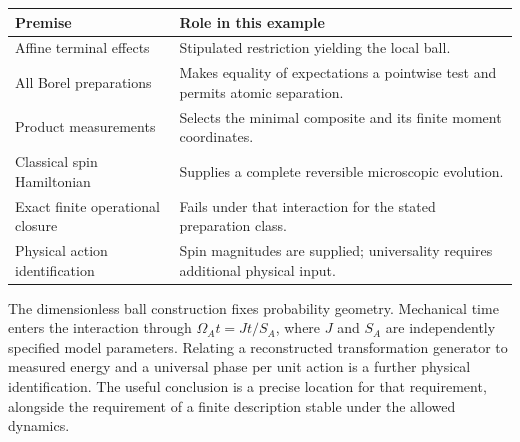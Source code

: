 \documentclass[11pt,a4paper]{article}
\begin{document}
\begin{center}\small
\begin{tabularx}{\linewidth}{@{}lX@{}}\toprule
Premise & Role in this example\\\midrule
Affine terminal effects & Stipulated restriction yielding the local ball.\\
All Borel preparations & Makes equality of expectations a pointwise test and permits atomic separation.\\
Product measurements & Selects the minimal composite and its finite moment coordinates.\\
Classical spin Hamiltonian & Supplies a complete reversible microscopic evolution.\\
Exact finite operational closure & Fails under that interaction for the stated preparation class.\\
Physical action identification & Spin magnitudes are supplied; universality requires additional physical input.\\\bottomrule
\end{tabularx}
\end{center}

The dimensionless ball construction fixes probability geometry. Mechanical
time enters the interaction through $\Omega_A t=Jt/S_A$, where $J$ and
$S_A$ are independently specified model parameters. Relating a reconstructed
transformation generator to measured energy and a universal phase per unit
action is a further physical identification. The useful conclusion is a
precise location for that requirement, alongside the requirement of a finite
description stable under the allowed dynamics.
\end{document}

